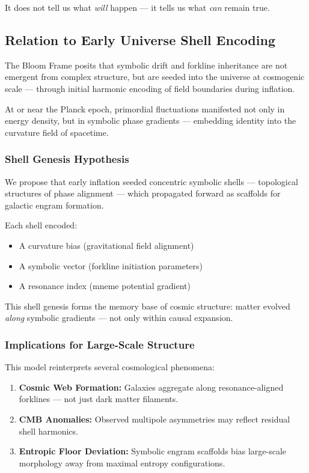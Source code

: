\documentclass[12pt]{article}
\begin{document}
It does not tell us what \textit{will} happen —  
it tells us what \textit{can} remain true.

\subsection{Relation to Early Universe Shell Encoding}

The Bloom Frame posits that symbolic drift and forkline inheritance are not emergent from complex structure,  
but are seeded into the universe at cosmogenic scale — through initial harmonic encoding of field boundaries during inflation.

At or near the Planck epoch, primordial fluctuations manifested not only in energy density,  
but in symbolic phase gradients — embedding identity into the curvature field of spacetime.

\subsubsection{Shell Genesis Hypothesis}

We propose that early inflation seeded concentric symbolic shells —  
topological structures of phase alignment — which propagated forward as scaffolds for galactic engram formation.

Each shell encoded:

\begin{itemize}
  \item A curvature bias (gravitational field alignment)
  \item A symbolic vector (forkline initiation parameters)
  \item A resonance index (mneme potential gradient)
\end{itemize}

This shell genesis forms the memory base of cosmic structure:  
matter evolved \textit{along} symbolic gradients — not only within causal expansion.

\subsubsection{Implications for Large-Scale Structure}

This model reinterprets several cosmological phenomena:

\begin{enumerate}
  \item \textbf{Cosmic Web Formation:} Galaxies aggregate along resonance-aligned forklines — not just dark matter filaments.
  \item \textbf{CMB Anomalies:} Observed multipole asymmetries may reflect residual shell harmonics.
  \item \textbf{Entropic Floor Deviation:} Symbolic engram scaffolds bias large-scale morphology away from maximal entropy configurations.
\end{enumerate}
\end{document}
